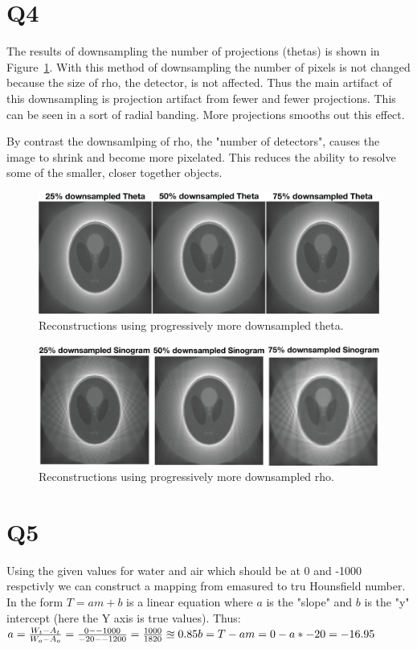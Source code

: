 \documentclass[12pt]{article}
\begin{document}
\section{Q4}
The results of downsampling the number of projections (thetas) is shown in Figure~\ref{dtheta}. With this method of downsampling the number of pixels is not changed because the size of rho, the detector, is not affected. Thus the main artifact of this downsampling is projection artifact from fewer and fewer projections. This can be seen in a  sort of radial banding. More projections smooths out this effect.

By contrast the downsamlping of rho, the "number of detectors", causes the image to shrink and become more pixelated. This reduces the ability to resolve some of the smaller, closer together objects.

\begin{figure}[H]
	\includegraphics[width=\textwidth]{downtheta.png}
	\caption{Reconstructions using progressively more downsampled theta.}
	\label{dtheta}
\end{figure}
\begin{figure}[H]
	\includegraphics[width=\textwidth]{downrho.png}
	\caption{Reconstructions using progressively more downsampled rho.}
	\label{drho}
\end{figure}
\section{Q5}
Using the given values for water and air which should be at 0 and -1000 respctivly we can construct a mapping from emasured to tru Hounsfield number. In the form $T = am + b$ is a linear equation where $a$ is the "slope" and $b$ is the "y" intercept (here the Y axis is true values). Thus:\\
$
a = \frac{W_t - A_t}{W_o - A_o} = \frac{0 - -1000}{-20 - -1200} = \frac{1000}{1820} \approxeq 0.85\\
b = T - am = 0 - a*-20 = -16.95\\$
\end{document}

